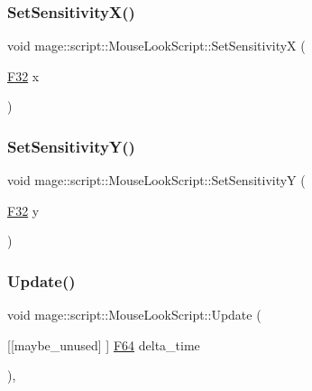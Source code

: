 \subsubsection{\texorpdfstring{Set\+Sensitivity\+X()}{SetSensitivityX()}}
{\footnotesize\ttfamily void mage\+::script\+::\+Mouse\+Look\+Script\+::\+Set\+SensitivityX (\begin{DoxyParamCaption}\item[{\hyperlink{namespacemage_aa97e833b45f06d60a0a9c4fc22ae02c0}{F32}}]{x }\end{DoxyParamCaption})\hspace{0.3cm}{\ttfamily [noexcept]}}

\hypertarget{classmage_1_1script_1_1_mouse_look_script_a95376c27d55cf12d557427b68ccbd802}{}\label{classmage_1_1script_1_1_mouse_look_script_a95376c27d55cf12d557427b68ccbd802} 
\subsubsection{\texorpdfstring{Set\+Sensitivity\+Y()}{SetSensitivityY()}}
{\footnotesize\ttfamily void mage\+::script\+::\+Mouse\+Look\+Script\+::\+Set\+SensitivityY (\begin{DoxyParamCaption}\item[{\hyperlink{namespacemage_aa97e833b45f06d60a0a9c4fc22ae02c0}{F32}}]{y }\end{DoxyParamCaption})\hspace{0.3cm}{\ttfamily [noexcept]}}

\hypertarget{classmage_1_1script_1_1_mouse_look_script_a6d38748c21a6bc475e8ac31e24459053}{}\label{classmage_1_1script_1_1_mouse_look_script_a6d38748c21a6bc475e8ac31e24459053} 
\subsubsection{\texorpdfstring{Update()}{Update()}}
{\footnotesize\ttfamily void mage\+::script\+::\+Mouse\+Look\+Script\+::\+Update (\begin{DoxyParamCaption}\item[{\mbox{[}\mbox{[}maybe\+\_\+unused\mbox{]} \mbox{]} \hyperlink{namespacemage_ad26233bbec640deda836e572c1a23708}{F64}}]{delta\+\_\+time }\end{DoxyParamCaption})\hspace{0.3cm}{\ttfamily [override]}, {\ttfamily [virtual]}}

